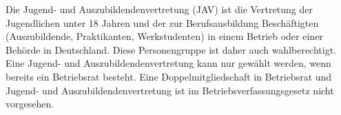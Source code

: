 Die Jugend- und Auszubildendenvertretung (JAV) ist die Vertretung der Jugendlichen unter 18 Jahren und der zur Berufsausbildung Beschäftigten (Auszubildende, Praktikanten, Werkstudenten) in einem Betrieb oder einer Behörde in Deutschland. Diese Personengruppe ist daher auch wahlberechtigt.
\newline
Eine Jugend- und Auszubildendenvertretung kann nur gewählt werden, wenn bereits ein Betriebsrat besteht. Eine Doppelmitgliedschaft in Betriebsrat und Jugend- und Auszubildendenvertretung ist im Betriebsverfassungsgesetz nicht vorgesehen. 